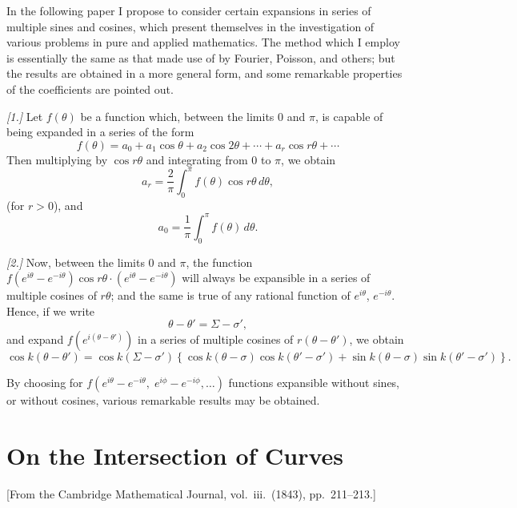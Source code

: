 \documentclass[11pt,a4paper]{book}
\theoremstyle{plain}
\theoremstyle{definition}
\theoremstyle{remark}
\begin{document}
In the following paper I propose to consider certain expansions in series of multiple sines and cosines, which present themselves in the investigation of various problems in pure and applied mathematics. The method which I employ is essentially the same as that made use of by Fourier, Poisson, and others; but the results are obtained in a more general form, and some remarkable properties of the coefficients are pointed out.

\textit{[1.]} Let $f(\theta)$ be a function which, between the limits $0$ and $\pi$, is capable of being expanded in a series of the form
\[
f(\theta) = a_0 + a_1 \cos \theta + a_2 \cos 2\theta + \cdots + a_r \cos r\theta + \cdots
\]
Then multiplying by $\cos r\theta$ and integrating from $0$ to $\pi$, we obtain
\[
a_r = \frac{2}{\pi} \int_0^{\pi} f(\theta) \cos r\theta\, d\theta,
\]
(for $r > 0$), and
\[
a_0 = \frac{1}{\pi} \int_0^{\pi} f(\theta)\, d\theta.
\]

\textit{[2.]} Now, between the limits $0$ and $\pi$, the function $f(e^{i\theta} - e^{-i\theta}) \cos r\theta \cdot (e^{i\theta} - e^{-i\theta})$ will always be expansible in a series of multiple cosines of $r\theta$; and the same is true of any rational function of $e^{i\theta}$, $e^{-i\theta}$. Hence, if we write
\[
\theta - \theta' = \Sigma - \sigma',
\]
and expand $f(e^{i(\theta-\theta')})$ in a series of multiple cosines of $r(\theta - \theta')$, we obtain
\[
\cos k(\theta - \theta') = \cos k(\Sigma - \sigma') \left\{\cos k(\theta - \sigma) \cos k(\theta' - \sigma') + \sin k(\theta - \sigma) \sin k(\theta' - \sigma')\right\}.
\]

By choosing for $f(e^{i\theta} - e^{-i\theta},\; e^{i\phi} - e^{-i\phi},\ldots)$ functions expansible without sines, or without cosines, various remarkable results may be obtained.

\cleardoublepage

\chapter{On the Intersection of Curves}
\label{chap:paper5}

\begin{center}
\small[From the Cambridge Mathematical Journal, vol.~iii.\ (1843), pp.~211--213.]
\end{center}

\section*{}
\end{document}
